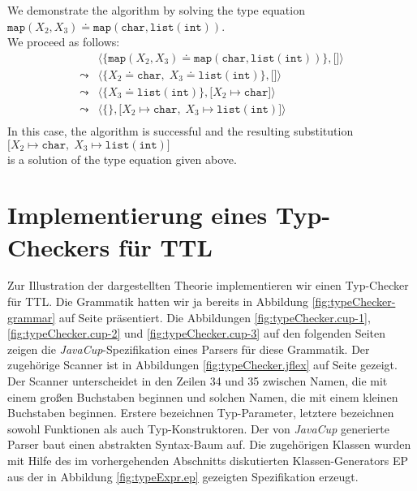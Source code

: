 \exampleEng
We demonstrate the algorithm by solving the type equation \\[0.1cm]
\hspace*{1.3cm}  $\texttt{map}( X_2, X_3) \doteq \texttt{map}(\texttt{char}, \mathtt{list}(\texttt{int}))$.  
\\[0.1cm]
We proceed as follows:
$$
\begin{array}{ll}
          &  \big\langle \big\{ \texttt{map}( X_2, X_3) \doteq \texttt{map}(\texttt{char}, \texttt{list}(\texttt{int}))  \big\}, \big[ \big] \big\rangle \\[0.2cm]
 \leadsto &  \big\langle \big\{ X_2 \doteq \mathtt{char},\;  X_3 \doteq\texttt{list}(\texttt{int}) \big\}, \big[ \big] \big\rangle \\[0.2cm]
 \leadsto &  \big\langle \big\{ X_3 \doteq \texttt{list}(\texttt{int}) \big\}, \big[ X_2 \mapsto \mathtt{char} \big] \big\rangle \\[0.2cm]
 \leadsto &  \big\langle \big\{\big\}, \big[ X_2 \mapsto \texttt{char},\; X_3 \mapsto \texttt{list}(\texttt{int}) \big] \big\rangle \\[0.2cm]
\end{array}
$$
In this case, the algorithm is successful and the resulting  substitution  \\[0.1cm]
\hspace*{1.3cm} $\big[ X_2 \mapsto \texttt{char},\; X_3 \mapsto \texttt{list}(\texttt{int}) \big]$ \\[0.1cm]
is a solution of the type equation given above.  
\pagebreak

%

\section{Implementierung eines Typ-Checkers f\"ur \textsc{TTL}}
Zur Illustration der dargestellten Theorie implementieren wir einen Typ-Checker f\"ur \textsc{TTL}.
Die Grammatik hatten wir ja bereits in Abbildung \ref{fig:typeChecker-grammar} auf Seite
\pageref{fig:typeChecker-grammar} pr\"asentiert.  Die Abbildungen 
\ref{fig:typeChecker.cup-1}, \ref{fig:typeChecker.cup-2} und \ref{fig:typeChecker.cup-3} 
auf den folgenden Seiten zeigen die \textsl{JavaCup}-Spezifikation eines Parsers f\"ur diese Grammatik.
Der zugeh\"orige Scanner ist in Abbildungen  \ref{fig:typeChecker.jflex} auf Seite
\pageref{fig:typeChecker.jflex} gezeigt.  Der Scanner unterscheidet in den Zeilen 34 und 35 zwischen
Namen, die mit einem gro{\ss}en Buchstaben beginnen und solchen Namen, die mit einem kleinen Buchstaben
beginnen.  Erstere bezeichnen Typ-Parameter, letztere bezeichnen sowohl Funktionen als auch Typ-Konstruktoren.
Der von \textsl{JavaCup} generierte Parser baut einen abstrakten
Syntax-Baum auf.  Die zugeh\"origen Klassen wurden mit Hilfe des im vorhergehenden Abschnitts diskutierten
Klassen-Generators 
\textsc{EP} aus der in Abbildung \ref{fig:typeExpr.ep} gezeigten Spezifikation erzeugt.



